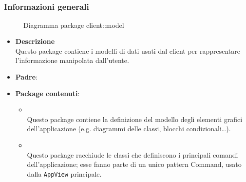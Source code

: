 \subsection{}
\label{\nogloxy{swedesigner::client::model}}
\subsubsection{Informazioni generali}
\begin{figure}[H]
	\caption{Diagramma package client::model}
\end{figure}
\begin{itemize}
\item \textbf{Descrizione}\\
Questo package contiene i modelli di dati usati dal client per rappresentare l'informazione manipolata dall'utente.
\item \textbf{Padre}: \hyperref[\nogloxy{swedesigner::client}]{}
\item \textbf{Package contenuti}:
\begin{itemize}
\item \hyperref[\nogloxy{swedesigner::client::model::celltypes}]{}\\
Questo package contiene la definizione del modello degli elementi grafici dell'applicazione (e.g. diagrammi delle classi, blocchi condizionali\dots). 
\item \hyperref[\nogloxy{swedesigner::client::model::utility}]{}\\
Questo package racchiude le classi che definiscono i principali comandi dell'applicazione; esse fanno parte di un unico pattern Command, usato dalla \texttt{AppView} principale.
\end{itemize}
\end{itemize}
